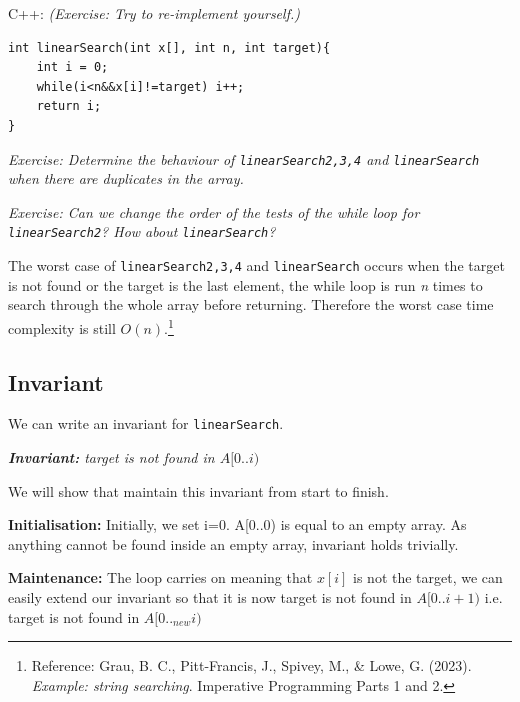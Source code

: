 C++: \textit{(Exercise:  Try to re-implement yourself.)}
\begin{lstlisting} 
int linearSearch(int x[], int n, int target){
    int i = 0;
    while(i<n&&x[i]!=target) i++;
    return i;
}
\end{lstlisting}

\textit{Exercise: Determine the behaviour of \texttt{linearSearch2,3,4} and \texttt{linearSearch} when there are duplicates in the array.}

\vspace{6mm}

\textit{Exercise: Can we change the order of the tests of the while loop for \texttt{linearSearch2}? How about \texttt{linearSearch}?}
\vspace{6mm}

The worst case of \texttt{linearSearch2,3,4} and \texttt{linearSearch} occurs when the target is not found or the target is the last element, the while loop is run \textit{n} times to search through the whole array before returning. Therefore the worst case time complexity is still $O(n)$.\footnote{Reference: Grau, B. C., Pitt-Francis, J., Spivey, M., \& Lowe, G. (2023). \textit{Example: string searching}. Imperative Programming Parts 1 and 2.}

\if{}

\subsection*{Invariant}

We can write an invariant for \texttt{linearSearch}.

\begin{center}
    \textit{\textbf{Invariant:}\hspace{6mm} target is not found in $A[0..i)$}
\end{center}

We will show that maintain this invariant from start to finish. 
\vspace{6mm}

\textbf{Initialisation:} Initially, we set i=0. A[0..0) is equal to an empty array. As anything cannot be found inside an empty array, invariant holds trivially.
\vspace{6mm}

\textbf{Maintenance:} The loop carries on meaning that $x[i]$ is not the target, we can easily extend our invariant so that it is now target is not found in $A[0..i+1)$ i.e. target is not found in $A[0.._{new}i)$
\vspace{6mm}


